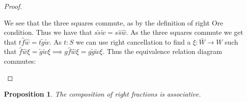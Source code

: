 \documentclass[12pt]{article}
\newtheorem{prop}[theorem]{Proposition}
\theoremstyle{definition}
\theoremstyle{remark}
\begin{document}
\begin{proof}
\begin{center}
                \end{center}
                We see that the three squares commute, as by the definition of right Ore condition. Thus we have that $s\widetilde{s}\widetilde{w} = s\widehat{s}\widehat{w}$. As the three squares commute we get that $t\widehat{f}\widehat{w}=t\widetilde{g}\widetilde{w}$. As $t:S$ we can use right cancellation to find a $\xi:\bar{W}\rightarrow W$ such that $\widehat{f}\widehat{w}\xi = \widetilde{g}\widetilde{w}\xi \implies g\widehat{f}\widehat{w}\xi = g\widetilde{g}\widetilde{w}\xi$. Thus the equivalence relation diagram commutes:
                \begin{center}
                \end{center}
            \end{proof}

            \begin{prop}
                The composition of right fractions is associative.
            \end{prop}
\end{document}
